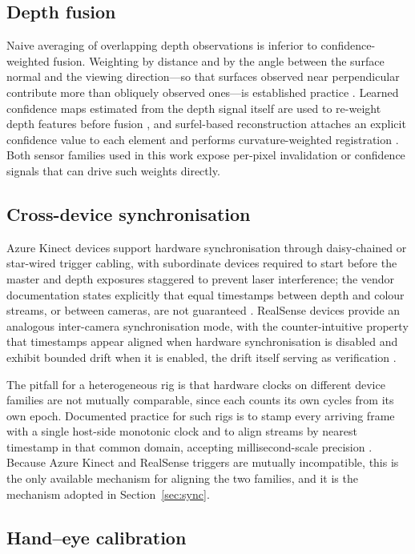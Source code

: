 \subsection{Depth fusion}

Naive averaging of overlapping depth observations is inferior to
confidence-weighted fusion. Weighting by distance and by the angle between the
surface normal and the viewing direction---so that surfaces observed near
perpendicular contribute more than obliquely observed ones---is established
practice \cite{fusionpatent}. Learned confidence maps estimated from the depth
signal itself are used to re-weight depth features before fusion
\cite{zeng}, and surfel-based reconstruction attaches an explicit confidence
value to each element and performs curvature-weighted registration
\cite{hrbf}. Both sensor families used in this work expose per-pixel
invalidation or confidence signals that can drive such weights directly.

\subsection{Cross-device synchronisation}

Azure Kinect devices support hardware synchronisation through daisy-chained or
star-wired trigger cabling, with subordinate devices required to start before
the master and depth exposures staggered to prevent laser interference; the
vendor documentation states explicitly that equal timestamps between depth and
colour streams, or between cameras, are not guaranteed \cite{mskinect}.
RealSense devices provide an analogous inter-camera synchronisation mode, with
the counter-intuitive property that timestamps appear aligned when hardware
synchronisation is disabled and exhibit bounded drift when it is enabled, the
drift itself serving as verification \cite{intel, ridgerun}.

The pitfall for a heterogeneous rig is that hardware clocks on different device
families are not mutually comparable, since each counts its own cycles from its
own epoch. Documented practice for such rigs is to stamp every arriving frame
with a single host-side monotonic clock and to align streams by nearest
timestamp in that common domain, accepting millisecond-scale precision
\cite{ridgerun}. Because Azure Kinect and RealSense triggers are mutually
incompatible, this is the only available mechanism for aligning the two
families, and it is the mechanism adopted in Section~\ref{sec:sync}.

\subsection{Hand--eye calibration}

